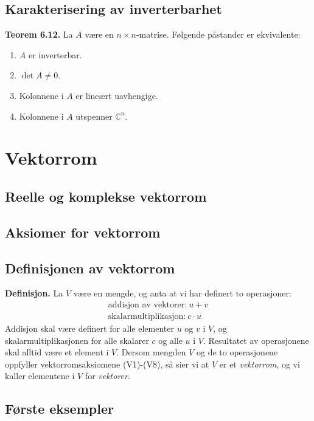 \documentclass{article}
\begin{document}
\subsection{Karakterisering av inverterbarhet}
\textbf{Teorem 6.12.} La $A$ være en $n \times n$-matrise. Følgende påstander er ekvivalente:
\begin{enumerate}
    \item $A$ er inverterbar.
    \item $\det{A} \neq 0$.
    \item Kolonnene i $A$ er lineært uavhengige.
    \item Kolonnene i $A$ utspenner $\mathbb{C}^n$.
\end{enumerate}




\clearpage
\section{Vektorrom}


\subsection{Reelle og komplekse vektorrom}


\subsection{Aksiomer for vektorrom}



\subsection{Definisjonen av vektorrom}
\textbf{Definisjon.} La $V$ være en mengde, og anta at vi har definert to operasjoner:
\begin{gather*}
    \text{addisjon av vektorer:} \ u + v \\
    \text{skalarmultiplikasjon:} \ c \cdot u
\end{gather*}
Addisjon skal være definert for alle elementer $u$ og $v$ i $V$, og skalarmultiplikasjonen for alle skalarer $c$ og alle $u$ i $V$. Resultatet av operasjonene skal alltid være et element i $V$. Dersom mengden $V$ og de to operasjonene oppfyller vektorromsaksiomene (V1)-(V8), så sier vi at $V$ er et \textit{vektorrom}, og vi kaller elementene i $V$ for \textit{vektorer}.


\subsection{Første eksempler}
\end{document}
